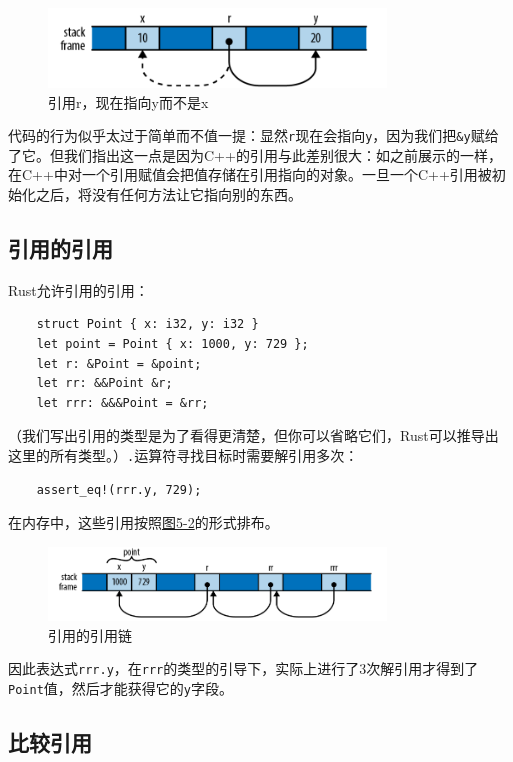 \begin{figure}[htbp]
    \centering
    \includegraphics[width=0.8\textwidth]{../img/f5-1.png}
    \caption{引用r，现在指向y而不是x}
    \label{f5-1}
\end{figure}

代码的行为似乎太过于简单而不值一提：显然\texttt{r}现在会指向\texttt{y}，因为我们把\texttt{\&y}赋给了它。但我们指出这一点是因为C++的引用与此差别很大：如之前展示的一样，在C++中对一个引用赋值会把值存储在引用指向的对象。一旦一个C++引用被初始化之后，将没有任何方法让它指向别的东西。

\subsection{引用的引用}
Rust允许引用的引用：
\begin{verbatim}
    struct Point { x: i32, y: i32 }
    let point = Point { x: 1000, y: 729 };
    let r: &Point = &point;
    let rr: &&Point &r;
    let rrr: &&&Point = &rr;
\end{verbatim}

（我们写出引用的类型是为了看得更清楚，但你可以省略它们，Rust可以推导出这里的所有类型。）\texttt{.}运算符寻找目标时需要解引用多次：
\begin{verbatim}
    assert_eq!(rrr.y, 729);
\end{verbatim}

在内存中，这些引用按照\hyperref[f5-2]{图5-2}的形式排布。

\begin{figure}[htbp]
    \centering
    \includegraphics[width=0.8\textwidth]{../img/f5-2.png}
    \caption{引用的引用链}
    \label{f5-2}
\end{figure}

因此表达式\texttt{rrr.y}，在\texttt{rrr}的类型的引导下，实际上进行了3次解引用才得到了\texttt{Point}值，然后才能获得它的\texttt{y}字段。

\subsection{比较引用}

